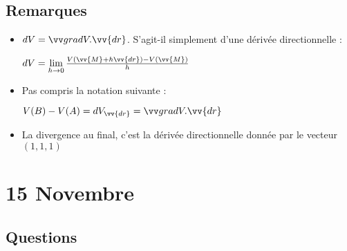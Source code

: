 \documentclass[a4paper, 11pt, hidelinks]{article}
\begin{document}
\subsection{Remarques}

\begin{itemize}
    \item $dV=\grad{V}.\vv{dr}$. S'agit-il simplement d'une dérivée directionnelle :
    
    $dV=\lim\limits_{h \rightarrow 0} \frac{V(\vv{M}+h\vv{dr})-V(\vv{M})}{h}$
    \item Pas compris la notation suivante :
    
    $V(B)-V(A)=dV_{\vv{dr}}=\grad{V}.\vv{dr}$
    \item La divergence au final, c'est la dérivée directionnelle donnée par le vecteur $(1,1,1)$
\end{itemize}


\section{15 Novembre}



\subsection{Questions}
\end{document}
